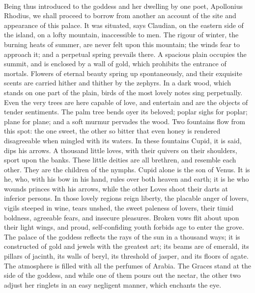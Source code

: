 \documentclass[a4paper, 11pt, oneside, polutonikogreek, english]{article}
\begin{document}
\paragraph{}
Being thus introduced to the goddess and her dwelling by one poet, Apollonius Rhodius, we shall proceed to borrow from another an account of the site and appearance of this palace. It was situated, says Claudian, on the eastern side of the island, on a lofty mountain, inaccessible to men. The rigour of winter, the burning heats of summer, are never felt upon this mountain; the winds fear to approach it; and a perpetual spring prevails there. A spacious plain occupies the summit, and is enclosed by a wall of gold, which prohibits the entrance of mortals. Flowers of eternal beauty spring up spontaneously, and their exquisite scents are carried hither and thither by the zephyrs. In a dark wood, which stands on one part of the plain, birds of the most lovely notes sing perpetually. Even the very trees are here capable of love, and entertain and are the objects of tender sentiments. The palm tree bends oyer its beloved; poplar sighs for poplar; plane for plane; and a soft murmur pervades the wood. Two fountains flow from this spot: the one sweet, the other so bitter that even honey is rendered disagreeable when mingled with its waters. In these fountains Cupid, it is said, dips his arrows. A thousand little loves, with their quivers on their shoulders, sport upon the banks. These little deities are all brethren, and resemble each other. They are the children of the nymphs. Cupid alone is the son of Venus. It is he, who, with his bow in his hand, rules over both heaven and earth; it is he who wounds princes with his arrows, while the other Loves shoot their darts at inferior persons. In those lovely regions reign liberty, the placable anger of lovers, vigils steeped in wine, tears unshed, the sweet paleness of lovers, their timid boldness, agreeable fears, and insecure pleasures. Broken vows flit about upon their light wings, and proud, self-confiding youth forbids age to enter the grove. The palace of the goddess reflects the rays of the sun in a thousand ways; it is constructed of gold and jewels with the greatest art; its beams are of emerald, its pillars of jacinth, its walls of beryl, its threshold of jasper, and its floors of agate. The atmosphere is filled with all the perfumes of Arabia. The Graces stand at the side of the goddess, and while one of them pours out the nectar, the other two adjust her ringlets in an easy negligent manner, which enchants the eye.
\end{document}
